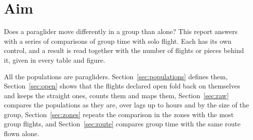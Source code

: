 \section{Aim}\label{sec:intro}

Does a paraglider move differently in a group than alone? This report answers with a series of
comparisons of group time with solo flight. Each has its own control, and a result is read together
with the number of flights or pieces behind it, given in every table and figure.

All the populations are paragliders. Section~\ref{sec:populations} defines them, Section~\ref{sec:open}
shows that the flights declared open fold back on themselves and keeps the straight ones, counts them and
maps them, Section~\ref{sec:raw} compares the populations as they are, over lags up to hours and by the
size of the group, Section~\ref{sec:zones} repeats the comparison in the zones with the most group
flights, and Section~\ref{sec:route} compares group time with the same route flown alone.
